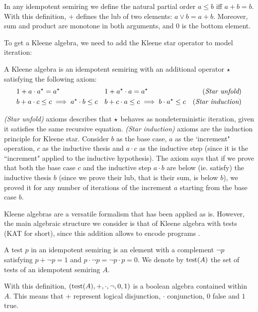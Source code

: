 In any idempotent semiring we define the natural partial order $a \le b$ iff $a + b = b$. With this definition, $+$ defines the lub of two elements: $a \lor b = a + b$. Moreover, sum and product are monotone in both arguments, and $0$ is the bottom element.

To get a Kleene algebra, we need to add the Kleene star operator to model iteration:
\begin{definition}\label{def:bg:kleene-algebra}
	A Kleene algebra is an idempotent semiring with an additional operator $\star$ satisfying the following axiom:
	\begin{align*}
		 & 1 + a \cdot a^\star = a^\star                     &  & 1 + a^\star \cdot a = a^\star                     & (\textit{Star unfold})    \\
		 & b + a \cdot c \le c \implies a^\star \cdot b \le c &  & b + c \cdot a \le c \implies b \cdot a^\star \le c & (\textit{Star induction})
	\end{align*}
\end{definition}
\textit{(Star unfold)} axioms describes that $\star$ behaves as nondeterministic iteration, given it satisfies the same recursive equation. \textit{(Star induction)} axioms are the induction principle for Kleene star. Consider $b$ as the base case, $a$ as the `increment" operation, $c$ as the inductive thesis and $a \cdot c$ as the inductive step (since it is the ``increment" applied to the inductive hypothesis). The axiom says that if we prove that both the base case $c$ and the inductive step $a \cdot b$ are below (ie. satisfy) the inductive thesis $b$ (since we prove their lub, that is their sum, is below $b$), we proved it for any number of iterations of the increment $a$ starting from the base case $b$.

Kleene algebras are a versatile formalism that has been applied as is. However, the main algebraic structure we consider is that of Kleene algebra with tests (KAT for short), since this addition allows to encode programs \cite{Kozen97}.
\begin{definition}[Test]
	A test $p$ in an idempotent semiring is an element with a complement $\lnot p$ satisfying $p + \lnot p = 1$ and $p \cdot \lnot p = \lnot p \cdot p = 0$. We denote by $\text{test}(A)$ the set of tests of an idempotent semiring $A$.
\end{definition}
With this definition, $(\text{test}(A), +, \cdot, \lnot, 0, 1)$ is a boolean algebra contained within $A$. This means that $+$ represent logical disjunction, $\cdot$ conjunction, $0$ false and $1$ true.

